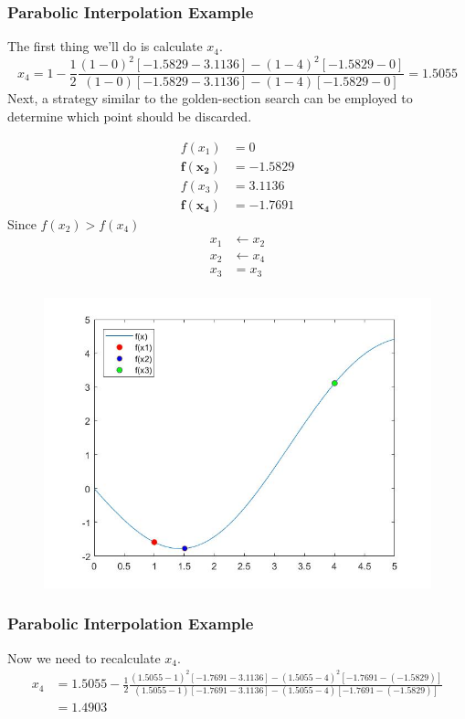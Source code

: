 \documentclass{if-beamer}
\begin{document}
\begin{frame}[t]
	\frametitle{Parabolic Interpolation Example}
	The first thing we'll do is calculate $x_4$.
	$$ x_4 = 1-\frac{1}{2}\frac{(1-0)^2[-1.5829-3.1136]-(1-4)^2[-1.5829-0]}{(1-0)[-1.5829-3.1136]-(1-4)[-1.5829-0]}=1.5055$$	
	Next, a strategy similar to the golden-section search can be employed to determine
	which point should be discarded.\\
	\begin{minipage}{0.5\textwidth}
		\begin{align*}
			f(x_1) &= 0\\
			\mathbf{f(x_2)} &= \mathbf{-1.5829}\\
			f(x_3) &= 3.1136\\
			\mathbf{f(x_4)} &= \mathbf{-1.7691}
		\end{align*}
		Since $f(x_2)>f(x_4)$
		\begin{align*}
			x_1 &\leftarrow x_2\\
			x_2 &\leftarrow x_4\\
			x_3 &= x_3\\
		\end{align*}
	\end{minipage}
	\begin{minipage}{0.5\textwidth}
		\begin{figure}
			\centering
			\includegraphics[width=\textwidth]{figures/plot3}
		\end{figure}
	\end{minipage}
\end{frame}

\begin{frame}[t]
	\frametitle{Parabolic Interpolation Example}
	Now we need to recalculate $x_4$.
	\begin{align*}
	x_4 &= 1.5055-\frac{1}{2}\frac{(1.5055-1)^2[-1.7691-3.1136]-(1.5055-4)^2[-1.7691-(-1.5829)]}{(1.5055-1)[-1.7691-3.1136]-(1.5055-4)[-1.7691-(-1.5829)]}\\
	&=1.4903\\
\end{align*}	
\end{frame}
\end{document}

